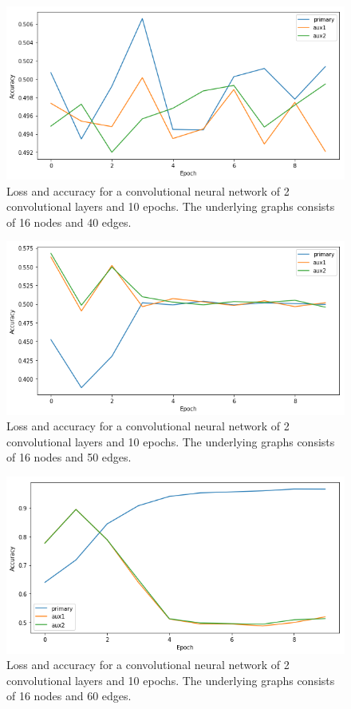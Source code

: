 \documentclass[letterpaper,UKenglish]{lipics-v2018}
\begin{document}
\begin{figure}
\centering
  \includegraphics[scale = .5]{pic/40-edges-conv.png}
\caption{Loss and accuracy for a convolutional neural network of 2 convolutional layers and 10 epochs. The underlying graphs consists of 16 nodes and 40 edges.}
\end{figure}

\begin{figure}
\centering
  \includegraphics[scale = .5]{pic/50-edges-conv.png}
\caption{Loss and accuracy for a convolutional neural network of 2 convolutional layers and 10 epochs. The underlying graphs consists of 16 nodes and 50 edges.}
\end{figure}

\begin{figure}
\centering
  \includegraphics[scale = .5]{pic/60-edges-conv.png}
\caption{Loss and accuracy for a convolutional neural network of 2 convolutional layers and 10 epochs. The underlying graphs consists of 16 nodes and 60 edges.}
\end{figure}
\end{document}
